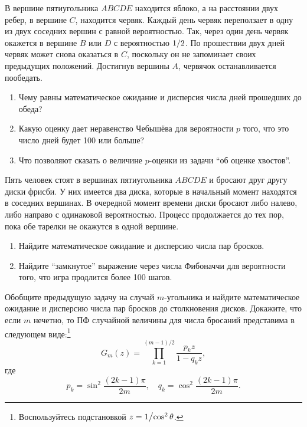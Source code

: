 \begin{problem}
В вершине пятиугольника $ABCDE$ 
находится яблоко, а на расстоянии двух ребер, в вершине $C$, находится 
червяк. Каждый день червяк переползает в одну из двух соседних вершин с 
равной вероятностью. Так, через один день червяк окажется в вершине $B$ или 
$D$ с вероятностью $1 \mathord{\left/ {\vphantom {1 2}} \right. 
\kern-\nulldelimiterspace} 2$. По прошествии двух дней червяк может снова 
оказаться в $C$, поскольку он не запоминает своих предыдущих положений. 
Достигнув вершины $A$, червячок останавливается пообедать.

\begin{enumerate}
\item Чему равны математическое ожидание и дисперсия числа дней прошедших до обеда?
\item Какую оценку дает неравенство Чебышёва для вероятности $p$ того, что это число дней будет 100 или больше?
\item Что позволяют сказать о величине $p$-оценки из задачи ``об оценке хвостов''.
\end{enumerate}
\end{problem}


\begin{problem}
Пять человек стоят в вершинах пятиугольника $ABCDE$ и 
бросают друг другу диски фрисби. У них имеется два диска, которые в 
начальный момент находятся в соседних вершинах. В очередной момент времени 
диски бросают либо налево, либо направо с одинаковой вероятностью. Процесс 
продолжается до тех пор, пока обе тарелки не окажутся в одной вершине.

\begin{enumerate}
\item Найдите математическое ожидание и дисперсию числа пар бросков.
\item Найдите ``замкнутое'' выражение через числа Фибоначчи для вероятности того, что игра продлится более 100 шагов.
\end{enumerate}
\end{problem}


\begin{problem}
Обобщите предыдущую задачу на случай $m$-угольника и найдите 
математическое ожидание и дисперсию числа пар бросков до столкновения 
дисков. Докажите, что если $m$ нечетно, то ПФ случайной величины  для числа бросаний 
представима в следующем виде:\footnote{ Воспользуйтесь подстановкой $z=1 
\mathord{\left/ {\vphantom {1 {\cos ^2\theta }}} \right. 
\kern-\nulldelimiterspace} {\cos ^2\theta }$.}
\[
G_m (z)=\prod\limits_{k=1}^{(m-1)/2} {\frac{p_k z}{1-q_k z}} ,
\]
где
\[
p_k =\sin ^2\frac{(2k-1)\pi }{2m},
\quad
q_k =\cos ^2\frac{(2k-1)\pi }{2m}.
\]
\end{problem}




